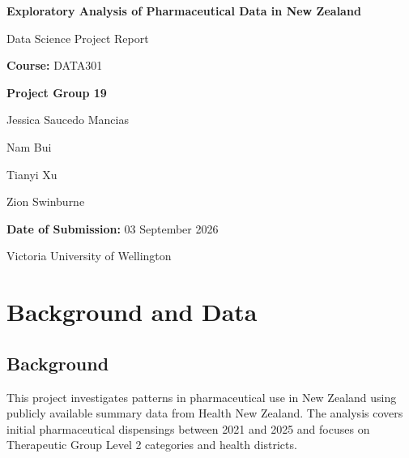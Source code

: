 \documentclass[11pt,a4paper]{report}
\begin{document}
\begin{titlepage}

\centering

\vspace*{2cm}

{\Huge \textbf{Exploratory Analysis of Pharmaceutical Data in New Zealand}\par}

\vspace{1.5cm}

{\Large Data Science Project Report\par}

\vspace{2cm}

{\large
\textbf{Course:} DATA301\par
}

{\large
\textbf{Project Group 19}\par}




\vspace{0.8cm}

{\large
Jessica Saucedo Mancias\par
Nam Bui\par
Tianyi Xu\par
Zion Swinburne\par
}

\vspace{1cm}


\vspace{0.5cm}

{\large
\textbf{Date of Submission:} 03 September 2026\par
}

\vfill

{\large
Victoria University of Wellington
\par}

\end{titlepage}

\tableofcontents

\clearpage


\chapter{Background and Data}

\section{Background}

This project investigates patterns in pharmaceutical use in New Zealand using publicly available summary data from Health New Zealand. The analysis covers initial pharmaceutical dispensings between 2021 and 2025 and focuses on Therapeutic Group Level 2 categories and health districts.
\end{document}
